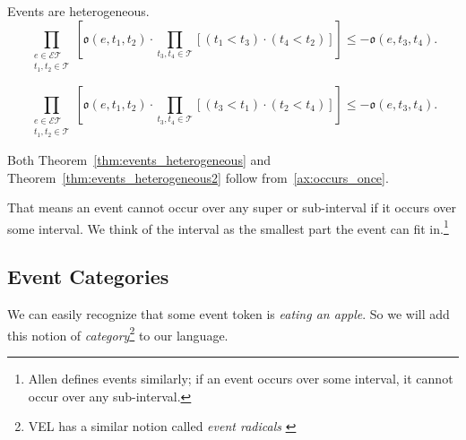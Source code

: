 
\begin{theorem}\label{thm:events_heterogeneous} Events are heterogeneous.
	\begin{equation}
		\prod_{\substack{e \in \mathcal{ET} \\ t_1, t_2 \in \mathcal{T}}} [\mathfrak{o}(e, t_1, t_2) \cdot \prod_{t_3, t_4 \in \mathcal{T}} [(t_1 < t_3) \cdot (t_4 < t_2)]]
		\leq - \mathfrak{o}(e, t_3, t_4).
		\label{eq:events_heterogeneous}
	\end{equation}
\end{theorem}
\begin{theorem}\label{thm:events_heterogeneous2}
	\begin{equation}
		\prod_{\substack{e \in \mathcal{ET} \\ t_1, t_2 \in \mathcal{T}}}[ \mathfrak{o}(e, t_1, t_2) \cdot \prod_{t_3, t_4 \in \mathcal{T}} [(t_3 < t_1) \cdot (t_2 < t_4)]]
		\leq - \mathfrak{o}(e, t_3, t_4).
		\label{eq:events_heterogeneous2}
	\end{equation}
\end{theorem}

Both Theorem~\ref{thm:events_heterogeneous} and Theorem~\ref{thm:events_heterogeneous2} follow from~\ref{ax:occurs_once}.

That means an event cannot occur over any super or sub-interval if it occurs over some interval.
We think of the interval as the smallest part the event can fit in.\footnote{Allen \cite{allen1984towards} defines events similarly; if an event occurs over some interval, it cannot occur over any sub-interval.
}

\subsection{Event Categories}
We can easily recognize that some event token is \textit{eating an apple}. So we will add this notion of \textit{category}\footnote{VEL has a similar notion called \textit{event radicals} \cite{bennett2001unifying}} to our language.

